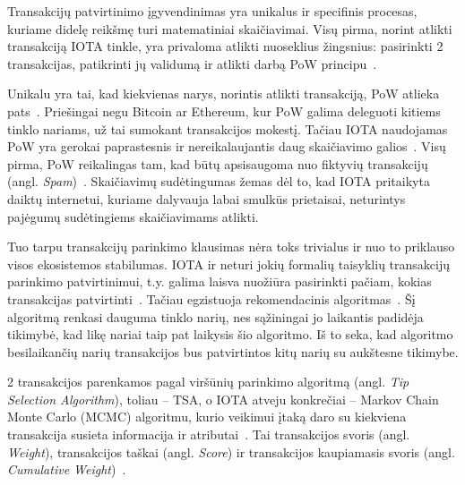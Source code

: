 Transakcijų patvirtinimo įgyvendinimas yra unikalus ir specifinis procesas, kuriame didelę reikšmę turi matematiniai skaičiavimai. Visų pirma, norint atlikti transakciją IOTA tinkle, yra privaloma atlikti nuoseklius žingsnius: pasirinkti 2 transakcijas, patikrinti jų validumą ir atlikti darbą PoW principu~\cite{popov2016tangle}. 

Unikalu yra tai, kad kiekvienas narys, norintis atlikti transakciją, PoW atlieka pats~\cite{bramas2018stability}. Priešingai negu Bitcoin ar Ethereum, kur PoW galima deleguoti kitiems tinklo nariams, už tai sumokant transakcijos mokestį. Tačiau IOTA naudojamas PoW yra gerokai paprastesnis ir nereikalaujantis daug skaičiavimo galios~\cite{popov2016tangle}. Visų pirma, PoW reikalingas tam, kad būtų apsisaugoma nuo fiktyvių transakcijų (angl. \textit{Spam})~\cite{popov2016tangle}. Skaičiavimų sudėtingumas žemas dėl to, kad IOTA pritaikyta daiktų internetui, kuriame dalyvauja labai smulkūs prietaisai, neturintys pajėgumų sudėtingiems skaičiavimams atlikti.

Tuo tarpu transakcijų parinkimo klausimas nėra toks trivialus ir nuo to priklauso visos ekosistemos stabilumas. IOTA ir neturi jokių formalių taisyklių transakcijų parinkimo patvirtinimui, t.y. galima laisva nuožiūra pasirinkti pačiam, kokias transakcijas patvirtinti~\cite{popov2016tangle}. Tačiau egzistuoja rekomendacinis algoritmas~\cite{popov2016tangle}. Šį algoritmą renkasi dauguma tinklo narių, nes sąžiningai jo laikantis padidėja tikimybė, kad likę nariai taip pat laikysis šio algoritmo. Iš to seka, kad algoritmo besilaikančių narių transakcijos bus patvirtintos kitų narių su aukštesne tikimybe.

2 transakcijos parenkamos pagal viršūnių parinkimo algoritmą (angl. \textit{Tip Selection Algorithm}), toliau – TSA, o IOTA atveju konkrečiai – Markov Chain Monte Carlo (MCMC) algoritmu, kurio veikimui įtaką daro su kiekviena transakcija susieta informacija ir atributai~\cite{bramas2018stability}. Tai transakcijos svoris (angl. \textit{Weight}), transakcijos taškai (angl. \textit{Score}) ir transakcijos kaupiamasis svoris (angl. \textit{Cumulative Weight})~\cite{popov2016tangle}. 




 \label{subsection:dag-security}

